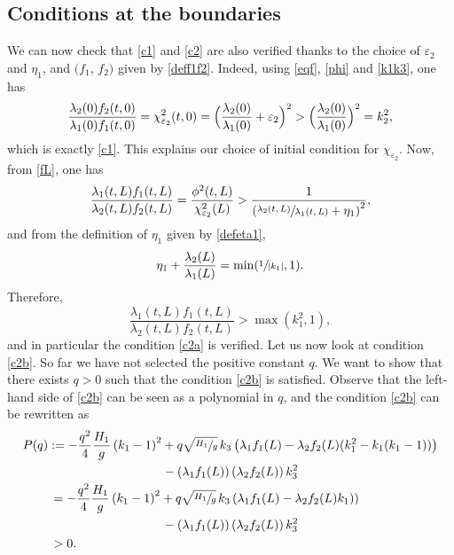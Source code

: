 \subsection{Conditions at the boundaries}
We can now check that
\eqref{c1} and \eqref{c2} are also verified thanks to the choice of $\varepsilon_{2}$ and $\eta_{1}${, and $(f_{1}$, $f_{2})$ given by \eqref{deff1f2}}. Indeed, using \eqref{eqf}{, \eqref{phi}} and \eqref{k1k3}, one has
\begin{equation*}
\frac{\lambda_{2}(0)f_{2}(t,0)}{\lambda_{1}(0)f_{1}(t,0)}=\chi_{\varepsilon_{2}}^{2}(t,0)= \Bigl(\frac{\lambda_{2}(0)}{\lambda_{1}(0)}+\varepsilon_{2} \Bigr)^{2}> \Bigl(\frac{\lambda_{2}(0)}{\lambda_{1}(0)} \Bigr)^{2}=k_{2}^{2},
\end{equation*}
{which is exactly \eqref{c1}.} This explains our choice of initial condition for $\chi_{\varepsilon_{2}}$.
Now, from \eqref{fL}, one has
\begin{equation*}
\frac{\lambda_{1}(t,L)f_{1}(t,L)}{\lambda_{2}(t,L)f_{2}(t,L)}=\frac{\phi^{2}(t,L)}{\chi^{2}_{\varepsilon_{2}}(L)}>\frac{1}{\left(\sfrac{\lambda_{2}(t,L)}{\lambda_{1}(t,L)}+\eta_{1}\right)^{2}},
\end{equation*}
and from the definition of $\eta_{1}$ given by \eqref{defeta1},
\begin{equation*}
\eta_{1}+\frac{\lambda_{2}(L)}{\lambda_{1}(L)}=\min(\sfrac{1}{|k_{1}|},1).
\end{equation*}
Therefore,
\begin{equation}
\frac{\lambda_{1}(t,L)f_{1}(t,L)}{\lambda_{2}(t,L)f_{2}(t,L)}>\max(k_{1}^{2},1),
\label{cond3}
\end{equation}
and in particular
the condition \eqref{c2a} is verified. Let us now look at condition \eqref{c2b}. So far we have not selected the positive constant $q$.
We want to show that there exists $q>0$ such that the condition \eqref{c2b} is satisfied. Observe that the left-hand side of \eqref{c2b} can be seen as a polynomial in $q$,
and the condition \eqref{c2b} can be rewritten as
\begin{equation*}
\begin{split}
P(q)&:=
-\frac{q^{2}}{4}\frac{H_{1}}{g}\left(k_{1}-1\right)^{2}+q\sqrt{\sfrac{H_{1}}{g}}\,k_{3}\left(\lambda_{1}f_{1}(L)-\lambda_{2}f_{2}(L)(k_{1}^{2}-k_{1}(k_{1}-1))\right)
\\
&\hspace*{3.23cm}-\left(\lambda_{1}f_{1}(L)\right)\left(\lambda_{2}f_{2}(L)\right)k_{3}^{2}\\
&\,=-\frac{q^{2}}{4}\frac{H_{1}}{g}\left(k_{1}-1\right)^{2}+q\sqrt{\sfrac{H_{1}}{g}}\,k_{3}\left(\lambda_{1}f_{1}(L)-\lambda_{2}f_{2}(L)k_{1})\right)\\
&\hspace*{3.23cm}-\left(\lambda_{1}f_{1}(L)\right)\left(\lambda_{2}f_{2}(L)\right)k_{3}^{2}\\
&\,>0.
\end{split}
\end{equation*}
